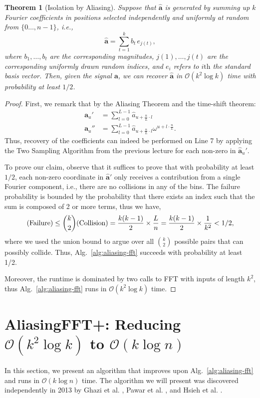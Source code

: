 \documentclass[11pt]{article}
\let\Pr\relax
\DeclareMathOperator*{\Pr}{\mathbb{P}}
\theoremstyle{case}
\newcommand{\Bigo}{\mathcal{O}}
\newcommand{\aaa}{\mathbf{a}}
\newtheorem{theorem}{Theorem}
\begin{document}
\begin{theorem}[Isolation by Aliasing]
Suppose that $\hat{\aaa}$ is generated by summing up $k$ Fourier coefficients in positions selected independently and uniformly at random from $\{0 \ldots, n-1\}$, i.e.,
\begin{equation}
\hat{\aaa} = \sum_{t = 1}^k b_t \, e_{j(t)},
\end{equation}
where $b_1,\ldots,b_t$ are the corresponding magnitudes, $j(1), \ldots, j(t)$ are the corresponding uniformly drawn random indices, and $e_i$ refers to $i \text{th}$ the standard basis vector. Then, given the signal $\aaa$, we can recover $\hat{\aaa}$ in $\Bigo(k^2 \log k)$ time with probability at least $1/2$.
\end{theorem}
\begin{proof}
First, we remark that by the Aliasing Theorem and the time-shift theorem:
\begin{align*}
\aaa_u' &= \sum_{l = 0}^{L - 1} \hat{a}_{u + \frac{n}{L} \cdot l}  \\
\aaa_u'' &= \sum_{l = 0}^{L - 1} \hat{a}_{u + \frac{n}{L} \cdot l} \omega^{u + l \cdot \frac{n}{L}}.
\end{align*}
Thus, recovery of the coefficients can indeed be performed on Line 7 by applying the Two Sampling Algorithm from the previous lecture for each non-zero in $\hat{\aaa}_u'$.

To prove our claim, observe that it suffices to prove that with probability at least $1/2$, each non-zero coordinate in $\hat{\aaa}'$ only receives a contribution from a single Fourier component, i.e., there are no collisions in any of the bins. The failure probability is bounded by the probability that there exists an index such that the sum is composed of 2 or more terms, thus we have,
$$
\Pr(\text{Failure}) \leq \binom{k}{2} \Pr(\text{Collision}) = \frac{k (k-1)}{2} \times \frac{L}{n} = \frac{k (k-1)}{2} \times \frac{1}{k^2} < 1/2,
$$
where we used the union bound to argue over all $\binom{k}{2}$ possible pairs that can possibly collide. Thus, Alg.~\ref{alg:aliasing-fft} succeeds with probability at least 1/2.

Moreover, the runtime is dominated by two calls to FFT with inputs of length $k^2$, thus Alg.~\ref{alg:aliasing-fft} runs in $\Bigo(k^2 \log k)$ time.
\end{proof}

\section{AliasingFFT+: Reducing $\Bigo(k^2 \log k)$ to $\Bigo(k \log n)$}
In this section, we present an algorithm that improves upon Alg.~\ref{alg:aliasing-fft} and runs in $\Bigo(k \log n)$ time. The algorithm we will present was discovered independently in 2013 by Ghazi et al. \cite{ghazi2013}, Pawar et al. \cite{pawar2013}, and Hsieh et al. \cite{hsieh2013}.
\end{document}

